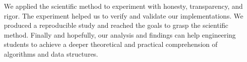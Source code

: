 \documentclass[a4paper,11pt]{kth-mag}
\newcommand*{\skippara}{\par\vspace{\baselineskip} \noindent}
\begin{document}
\skippara We applied the scientific method to experiment with honesty, transparency, and rigor. The experiment helped us to verify and validate our implementations. We produced a reproducible study and reached the goals to grasp the scientific method. Finally and hopefully, our analysis and findings can help engineering students to achieve a deeper theoretical and practical comprehension of algorithms and data structures.
%
\appendix
\addappheadtotoc
\end{document}
